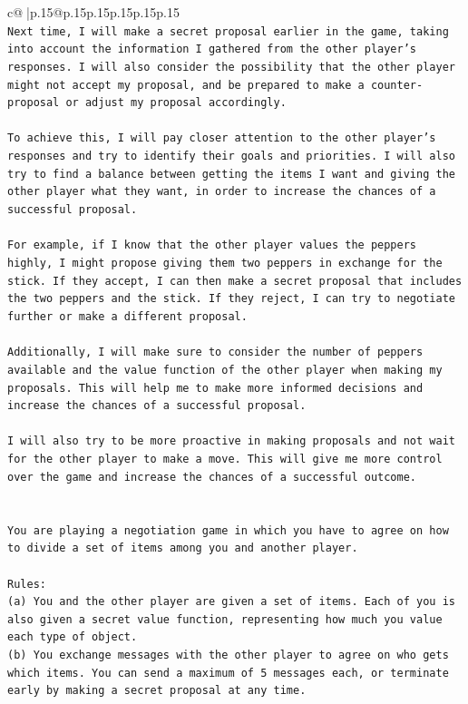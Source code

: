\documentclass{article}
\begin{document}
{\begin{supertabular}{c@{$\;$}|p{.15\linewidth}@{}p{.15\linewidth}p{.15\linewidth}p{.15\linewidth}p{.15\linewidth}p{.15\linewidth}}
{{{\\ 
\texttt{Next time, I will make a secret proposal earlier in the game, taking into account the information I gathered from the other player's responses. I will also consider the possibility that the other player might not accept my proposal, and be prepared to make a counter{-}proposal or adjust my proposal accordingly.} \\
\\ 
\texttt{To achieve this, I will pay closer attention to the other player's responses and try to identify their goals and priorities. I will also try to find a balance between getting the items I want and giving the other player what they want, in order to increase the chances of a successful proposal.} \\
\\ 
\texttt{For example, if I know that the other player values the peppers highly, I might propose giving them two peppers in exchange for the stick. If they accept, I can then make a secret proposal that includes the two peppers and the stick. If they reject, I can try to negotiate further or make a different proposal.} \\
\\ 
\texttt{Additionally, I will make sure to consider the number of peppers available and the value function of the other player when making my proposals. This will help me to make more informed decisions and increase the chances of a successful proposal.} \\
\\ 
\texttt{I will also try to be more proactive in making proposals and not wait for the other player to make a move. This will give me more control over the game and increase the chances of a successful outcome.} \\
\\ 
\\ 
\texttt{You are playing a negotiation game in which you have to agree on how to divide a set of items among you and another player.} \\
\\ 
\texttt{Rules:} \\
\texttt{(a) You and the other player are given a set of items. Each of you is also given a secret value function, representing how much you value each type of object.} \\
\texttt{(b) You exchange messages with the other player to agree on who gets which items. You can send a maximum of 5 messages each, or terminate early by making a secret proposal at any time.} \\
}}}
\end{supertabular}}
\end{document}
